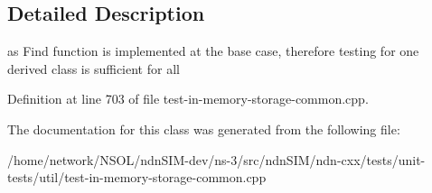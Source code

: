 \subsection{Detailed Description}
as Find function is implemented at the base case, therefore testing for one derived class is sufficient for all 

Definition at line 703 of file test-\/in-\/memory-\/storage-\/common.\+cpp.



The documentation for this class was generated from the following file\+:\begin{DoxyCompactItemize}
\item 
/home/network/\+N\+S\+O\+L/ndn\+S\+I\+M-\/dev/ns-\/3/src/ndn\+S\+I\+M/ndn-\/cxx/tests/unit-\/tests/util/test-\/in-\/memory-\/storage-\/common.\+cpp\end{DoxyCompactItemize}
